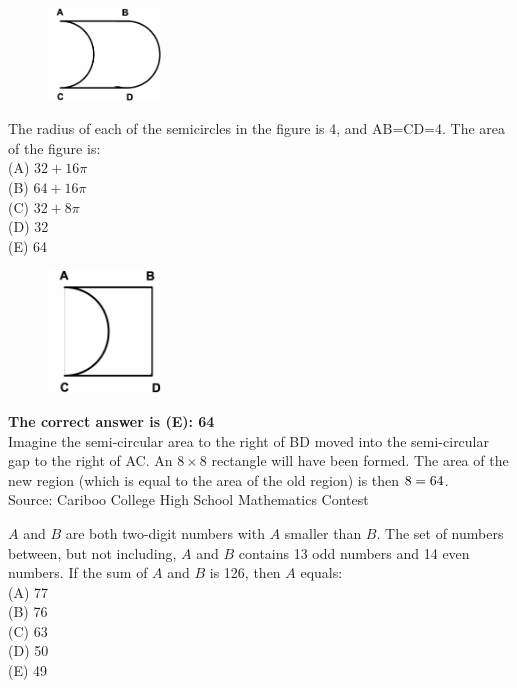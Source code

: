 \documentclass{article}
\begin{document}
\normalsize
\begin{figure}
	\includegraphics[width=30mm, viewport=29 173 491 578]{CCJPR74-4pic.eps}
\end{figure}
The radius of each of the semicircles in the figure is 4, and AB=CD=4. The area of the figure is:\\
(A) $32+16\pi$\\
(B) $64+16\pi$\\
(C) $32+8\pi$\\
(D) 32\\
(E) 64\\

\begin{figure}
	\includegraphics[width=30mm,viewport=22 180 351 579]{CCJPR74-4pic2.eps}
\end{figure}

\textbf{The correct answer is (E): 64}\\
Imagine the semi-circular area to the right of BD moved into the semi-circular gap to the right of AC. An $8\times8$ rectangle will have been formed. The area of the new region (which is equal to the area of the old region) is then $8\time8=64$.
\\[5 ex]

\scriptsize
Source: Cariboo College High School Mathematics Contest

\normalsize
$A$ and $B$ are both two-digit numbers with $A$ smaller than $B$. The set of numbers between, but not including, $A$ and $B$ contains 13 odd numbers and 14 even numbers. If the sum of $A$ and $B$ is 126, then $A$ equals:\\
(A) 77\\
(B) 76\\
(C) 63\\
(D) 50\\
(E) 49\\
\end{document}
